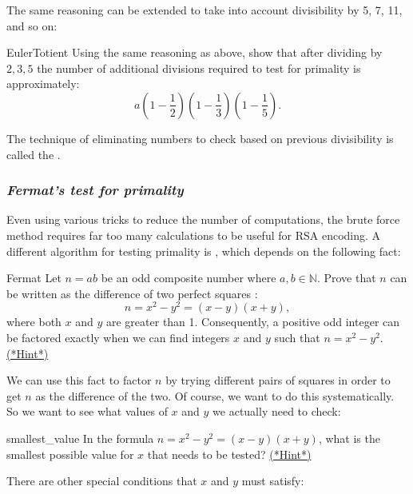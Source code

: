 The same reasoning can be extended to take into account divisibility by 5, 7, 11, and so on:

\begin{exercise}{EulerTotient}
Using the same reasoning as above, show that after dividing by $2,3,5$ the number of additional divisions required to test for primality is approximately:
$$a\left(1 - \frac{1}{2}\right) \left(1 - \frac{1}{3}\right)\left( 1 - \frac{1}{5} \right).$$
\end{exercise}

The technique of eliminating numbers to check based on previous divisibility is called the .


\subsubsection*{\emph{Fermat's test for primality}}
Even using various tricks to reduce the number of computations, the brute force method requires far too many calculations to be useful for RSA encoding. A different algorithm for testing primality is , which depends on the following fact:

\begin{exercise}{Fermat}
Let $n= ab$ be an odd composite number where $a,b \in \mathbb{N}$. Prove that $n$ can be written
as the difference of two perfect squares :
$$
n = x^2 - y^2 = (x-y)(x+y),
$$
where both $x$ and $y$ are greater than 1. Consequently, a positive odd integer can be factored exactly when we
can find integers $x$ and $y$ such that $n = x^2 - y^2$.
\hyperref[sec:Cryptography:Hints]{(*Hint*)} 
\end{exercise} 
We can use this fact to factor $n$ by trying different pairs of squares in order to get $n$ as the difference of the two.  Of course, we want to do this systematically. So we want to see what values of $x$ and $y$ we actually need to check:

\begin{exercise}{smallest_value}
In the formula  $n = x^2 - y^2 = (x-y)(x+y)$,  what is the smallest possible value for $x$ that needs to be tested?
\hyperref[sec:Cryptography:Hints]{(*Hint*)}
\end{exercise}

There are other special conditions that $x$ and $y$ must satisfy:

